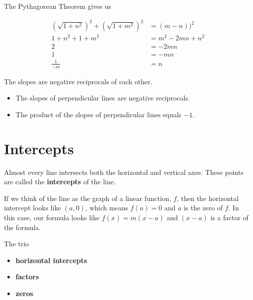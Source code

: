 \documentclass{ximera}
\begin{document}
The Pythagorean Theorem gives us


\begin{align*}
\left(\sqrt{1 + n^2}\right)^2 + \left(\sqrt{1 + m^2}\right)^2 & = (m-n))^2 \\
1 + n^2 + 1 + m^2 & = m^2 - 2 m n + n^2  \\
2 & = -2 m n \\
1 & = -m n \\
\frac{1}{-m} & = n
\end{align*}

The slopes are negative reciprocals of each other. \\


\begin{itemize}
\item The slopes of perpendicular lines are negative reciprocals.
\item The product of the slopes of perpendicular lines equals $-1$.
\end{itemize}



















\section{Intercepts}


Almost every line intersects both the horizontal and vertical axes.  These points are called the \textbf{intercepts} of the line.  

If we think of the line as the graph of a linear function, $f$, then the horizontal intercept looks like $(a, 0)$, which means $f(a)=0$ and $a$ is the zero of $f$. In this case, our formula looks like $f(x) = m (x-a)$ and $(x - a)$ is a factor of the formula.



The trio 

\begin{itemize}
\item \textbf{\textcolor{blue!55!black}{horizontal intercepts}} 
\item \textbf{\textcolor{blue!55!black}{factors}} 
\item \textbf{\textcolor{blue!55!black}{zeros}} 
\end{itemize}
\end{document}
